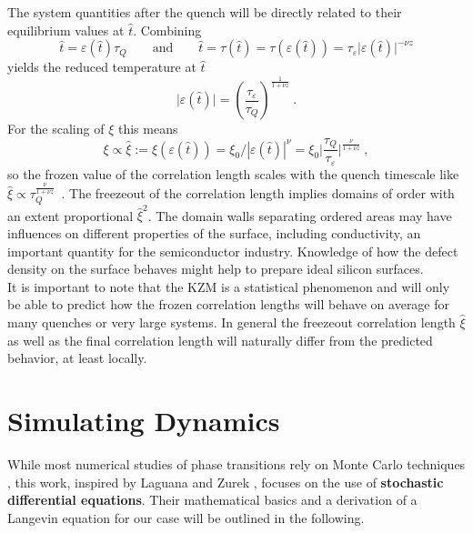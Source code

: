 	The system quantities after the quench will be directly related to their equilibrium values at $\hat{t}$. Combining
	\begin{equation}
		\hat{t} =	\varepsilon(\hat{t}) \tau_Q \qquad \text{and} \qquad  \hat{t} =	\tau(\hat{t}) = \tau(\varepsilon(\hat{t})) =	\tau_\varepsilon \big | \varepsilon(\hat{t}) \big |^{-\nu z}
	\end{equation}
	yields the reduced temperature at $\hat{t}$
	\begin{equation}
		\big|\varepsilon (\hat{t}) \big| =	\left(\frac{\tau_\varepsilon}{\tau_Q} \right)^{\frac{1}{1 + \nu z}} ~.
	\end{equation}
	For the scaling of $\xi$ this means
	\begin{equation} \label{Eq::KZM-scaling}
		\xi \propto \hat{\xi} := \xi(\varepsilon(\hat{t})) =	\xi_0 / |\varepsilon(\hat{t})|^{\nu} =	\xi_0 \bigg| \frac{\tau_Q}{\tau_\varepsilon} \bigg |^{\frac{\nu}{1 + \nu z}} ~,
	\end{equation}
	so the frozen value of the correlation length scales with the quench timescale like $\hat{\xi} \propto \tau_Q^{\frac{\nu}{1 + \nu z}}$~.
	The freezeout of the correlation length implies domains of order with an extent proportional $\hat{\xi}^2$. The domain walls separating ordered areas may have influences on different properties of the surface, including conductivity, an important quantity for the semiconductor industry. Knowledge of how the defect density on the surface behaves might help to prepare ideal silicon surfaces. \\
	
	It is important to note that the KZM is a statistical phenomenon and will only be able to predict how the frozen correlation lengths will behave on average for many quenches or very large systems. In general the freezeout correlation length $\hat{\xi}$ as well as the final correlation length will naturally differ from the predicted behavior, at least locally.
	\chapter{Simulating Dynamics} \label{Chapter::Simulating-Dynamics}
	While most numerical studies of phase transitions rely on Monte Carlo techniques \cite{rastelli2004monte, ferrenberg1991critical, hasenbusch2005two}, this work, inspired by Laguana and Zurek \cite{laguna1997density}, focuses on the use of \textbf{stochastic differential equations}. Their mathematical basics and a derivation of a Langevin equation for our case  will be outlined in the following.
